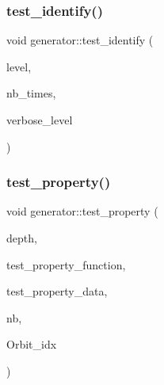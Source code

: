 \mbox{\label{classgenerator_afe1191d7f525d0f1197ffc81c966c632}} 
\subsubsection{\texorpdfstring{test\+\_\+identify()}{test\_identify()}}
{\footnotesize\ttfamily void generator\+::test\+\_\+identify (\begin{DoxyParamCaption}\item[{\mbox{\hyperlink{galois_8h_a09fddde158a3a20bd2dcadb609de11dc}{I\+NT}}}]{level,  }\item[{\mbox{\hyperlink{galois_8h_a09fddde158a3a20bd2dcadb609de11dc}{I\+NT}}}]{nb\+\_\+times,  }\item[{\mbox{\hyperlink{galois_8h_a09fddde158a3a20bd2dcadb609de11dc}{I\+NT}}}]{verbose\+\_\+level }\end{DoxyParamCaption})}

\mbox{\label{classgenerator_ae845a9dc626e6c2a20a6745a9d9fa68d}} 
\subsubsection{\texorpdfstring{test\+\_\+property()}{test\_property()}}
{\footnotesize\ttfamily void generator\+::test\+\_\+property (\begin{DoxyParamCaption}\item[{\mbox{\hyperlink{galois_8h_a09fddde158a3a20bd2dcadb609de11dc}{I\+NT}}}]{depth,  }\item[{\mbox{\hyperlink{galois_8h_a09fddde158a3a20bd2dcadb609de11dc}{I\+NT}}($\ast$)(\mbox{\hyperlink{galois_8h_a09fddde158a3a20bd2dcadb609de11dc}{I\+NT}} len, \mbox{\hyperlink{galois_8h_a09fddde158a3a20bd2dcadb609de11dc}{I\+NT}} $\ast$\mbox{\hyperlink{classgenerator_a5d2b65e2bd0e451744af1a47ba00bd96}{S}}, void $\ast$data)}]{test\+\_\+property\+\_\+function,  }\item[{void $\ast$}]{test\+\_\+property\+\_\+data,  }\item[{\mbox{\hyperlink{galois_8h_a09fddde158a3a20bd2dcadb609de11dc}{I\+NT}} \&}]{nb,  }\item[{\mbox{\hyperlink{galois_8h_a09fddde158a3a20bd2dcadb609de11dc}{I\+NT}} $\ast$\&}]{Orbit\+\_\+idx }\end{DoxyParamCaption})}

